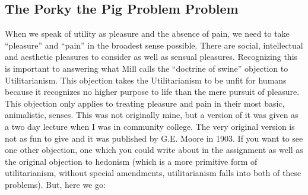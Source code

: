 \subsection{The Porky the Pig Problem Problem}

When we speak of utility as pleasure and the absence of pain, we need to take “pleasure” and “pain” in the broadest sense possible. There are social, intellectual and aesthetic pleasures to consider as well as sensual pleasures. Recognizing this is important to answering what Mill calls the “doctrine of swine” objection to Utilitarianism. This objection takes the Utilitarianism to be unfit for humans because it recognizes no higher purpose to life than the mere pursuit of pleasure. This objection only applies to treating pleasure and pain in their most basic, animalistic, senses.  This was not originally mine, but a version of it was given as a two day lecture when I was in community college. The very original version is not as fun to give and it was published by G.E. Moore in 1903. If you want to see one other objection, one which you could write about in the assignment as well as the original objection to hedonism (which is a more primitive form of utilitarianism, without special amendments, utilitarianism falls into both of these problems). But, here we go:


